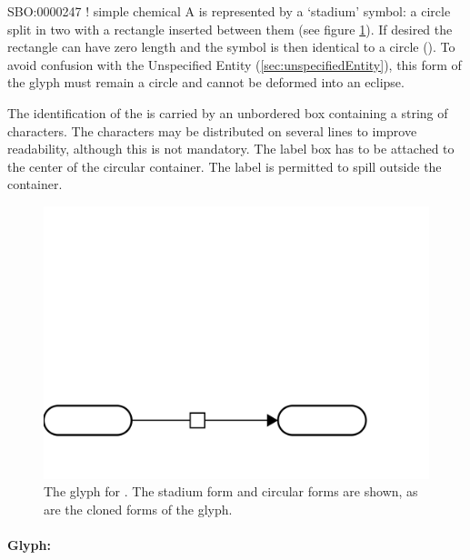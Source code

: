 \begin{glyphDescription}
  \glyphSboTerm SBO:0000247 ! simple chemical \glyphContainer A
   is represented by a `stadium' symbol: a
  circle split in two with a rectangle inserted between them (see
  figure \ref{fig:simpleChemical}). If desired the rectangle can have
  zero length and the symbol is then identical to a circle
  (). To avoid confusion with the Unspecified
  Entity (\ref{sec:unspecifiedEntity}), this form of the glyph must remain a
  circle and cannot be deformed into an eclipse.

  \glyphLabel The identification of the  is
  carried by an unbordered box containing a string of characters.  The
  characters may be distributed on several lines to improve
  readability, although this is not mandatory.  The label box has to
  be attached to the center of the circular container.  The label is
  permitted to spill outside the container.
\end{glyphDescription}

\begin{figure}[H]
  \centering
  \includegraphics[scale = 0.3]{images/simpleChemical}
  \caption{The \PD glyph for . The stadium
    form and circular forms are shown, as are the cloned forms of the glyph.}
  \label{fig:simpleChemical}
\end{figure}

\paragraph{Glyph: }

